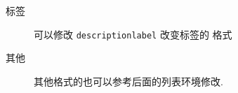 \documentclass[nofonts]{ctexart}
\begin{document}
{ %
	\renewcommand\descriptionlabel[1]{\normalfont\Large\itshape
	\textbullet\ #1}
	\begin{description}
		\item[标签] 可以修改 \verb=descriptionlabel= 改变标签的
			格式
		\item[其他] 其他格式的也可以参考后面的列表环境修改.
	\end{description}
}
\end{document}
